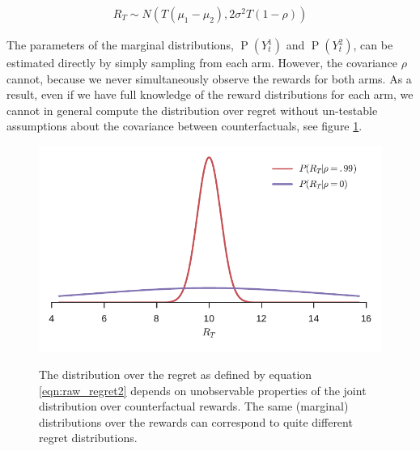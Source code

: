 \documentclass[11pt,a4paper,oneside]{book}
\newcommand{\eqn}[1]{\begin{align}#1\end{align}}
\renewcommand{\P}[1]{\operatorname{P}\left(#1\right)}
\newcommand{\cfb}[2]{{#1}_t^{#2}} %
\newcommand{\rawregret}{R_{T}} %
\theoremstyle{plain}
\theoremstyle{definition}
\begin{document}
\eqn{
\rawregret \sim N\left(T(\mu_1 - \mu_2), 2\sigma^2 T(1-\rho)\right)
}

The parameters of the marginal distributions, $\P{\cfb{Y}{1}}$ and $\P{\cfb{Y}{2}}$, can be estimated directly by simply sampling from each arm. However, the covariance $\rho$ cannot, because we never simultaneously observe the rewards for both arms. As a result, even if we have full knowledge of the reward distributions for each arm, we cannot in general compute the distribution over regret without un-testable assumptions about the covariance between counterfactuals, see figure \ref{fig:metaphysical_distribution_difference}. 

\begin{figure}[h]
\captionsetup[subfigure]{position=b}
\centering
{}
\hspace{0.02\textwidth}
{\includegraphics[width=.45\linewidth]{figures/counterfactual_nonidentify_b.pdf}}
\caption{The distribution over the regret as defined by equation \ref{eqn:raw_regret2} depends on unobservable properties of the joint distribution over counterfactual rewards. The same (marginal) distributions over the rewards can correspond to quite different regret distributions.}
\label{fig:metaphysical_distribution_difference}
\end{figure}
\end{document}
